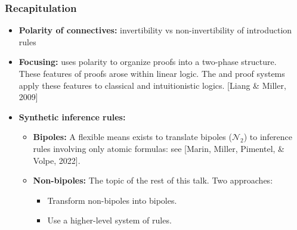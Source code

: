 \documentclass[9pt]{beamer}
\begin{document}
\begin{frame}
\frametitle{Recapitulation}

\begin{itemize}

\item \textbf{Polarity of connectives:} invertibility vs
  non-invertibility of introduction rules\\[10pt]

\item \textbf{Focusing:} uses polarity to organize proofs into a
  two-phase structure.\\[10pt]

  These features of proofs arose within linear logic.  The \LKF and
  \LJF proof systems apply these features to classical and
  intuitionistic logics.  [Liang \& Miller, 2009]\\[10pt]

\item \textbf{Synthetic inference rules:}
  \begin{itemize}
  \item \textbf{Bipoles:} A flexible means exists to translate bipoles
    ($\mathcal{N}_2$) to inference rules involving only atomic
    formulas: see [Marin, Miller, Pimentel, \& Volpe, 2022].\\[6pt]
\pause

  \item \textbf{Non-bipoles:} The topic of the rest of this talk. Two
    approaches:
    \begin{itemize}
    \item Transform non-bipoles into bipoles.
    \item Use a higher-level system of rules.
    \end{itemize}
  \end{itemize}

\end{itemize}

\end{frame}
\end{document}
